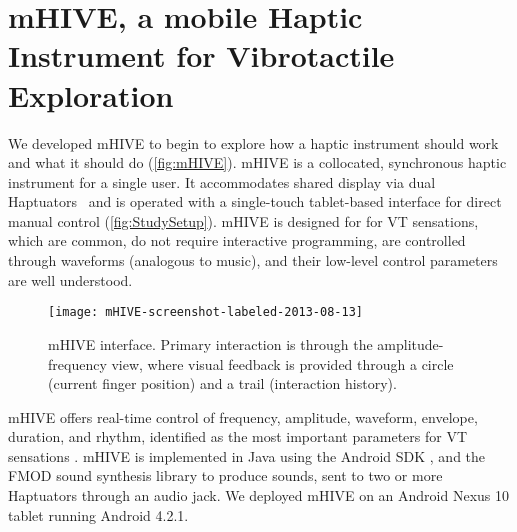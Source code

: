 \section{mHIVE, a mobile Haptic Instrument for Vibrotactile Exploration}
We developed mHIVE to begin to explore how a haptic instrument should work and what it should do %
(\autoref{fig:mHIVE}).
%
%
mHIVE is a collocated, synchronous haptic instrument for a single user. It accommodates shared display via dual
Haptuators~\cite{Yao2010}
and is operated with a single-touch tablet-based interface for direct manual control (\autoref{fig:StudySetup}). 
mHIVE is designed for for VT
sensations, which are common, do not require interactive programming, are controlled through waveforms (analogous to music), and their low-level control parameters are well understood.

\begin{figure}[tb]
   \centering
	   \texttt{[image: mHIVE-screenshot-labeled-2013-08-13]} 
	   \caption{mHIVE interface. Primary interaction is through the amplitude-frequency view, where visual feedback is provided through a circle (current finger position) and a trail (interaction history).}
	   \label{fig:mHIVE}
    \end{figure}


mHIVE offers real-time control of frequency, amplitude, waveform, envelope, duration, and rhythm, identified as the most important parameters for VT sensations \cite{Gunther2002,Brown2006a,Brown2006,Brewster2004, Rovan2000}.
mHIVE is implemented in Java using the Android SDK \cite{AndroidOpenSourceProject2012}, and the FMOD sound synthesis library \cite{fmod2013} to produce sounds, sent to two or more Haptuators through an audio jack.
We deployed mHIVE on an Android Nexus 10 tablet running Android 4.2.1.



